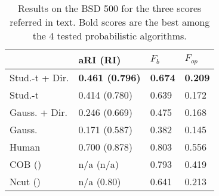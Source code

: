 \documentclass[a4paper,12pt]{article}
\begin{document}
\begin{wraptable}{R}{0.55\textwidth}
    \centering
    \begin{tabularx}{0.55\textwidth}{|L | K | C | C | }
        \hline
        & aRI (RI)   & $F_b$     & $F_{op}$    \\ \hline
		Stud.-t + Dir. & \bf{0.461} (\bf{0.796})        & \bf{0.674}        & \bf{0.209}        \\ \hline
        Stud.-t & 0.414 (0.780)        & 0.639        & 0.172         \\ \hline
        Gauss. + Dir. & 0.246 (0.669)       & 0.475        & 0.168         \\ \hline
        Gauss. & 0.171 (0.587)         & 0.382        & 0.145         \\ \hhline{|=|=|=|=|}  
        Human & 0.700 (0.878)        & 0.803        & 0.556         \\ \hhline{|=|=|=|=|}        
        COB (\cite{maninis2016convolutional}) & n/a (n/a)       & 0.793      & 0.419   	\\ \hline
        Ncut (\cite{cour2005spectral}) &    n/a (0.80)      & 0.641        & 0.213         \\ \hline
    \end{tabularx}
    \caption{Results on the BSD 500 for the three scores referred in text. Bold scores are the best among the 4 tested probabilistic algorithms.}
   	\label{tab:results}
\end{wraptable}
\end{document}

